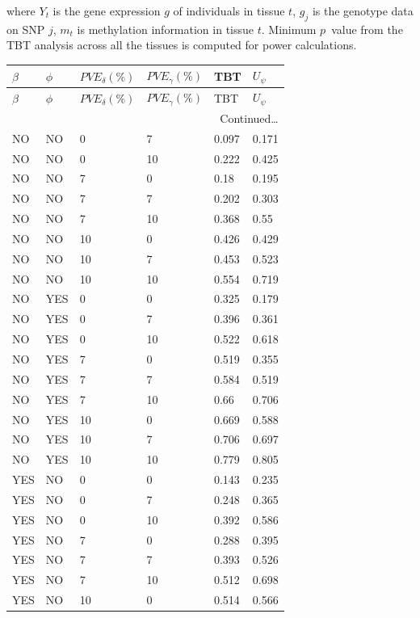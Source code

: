 \documentclass[hidelinks]{article}
\begin{document}
where $Y_t$ is the gene expression $g$ of individuals in tissue $t$, $g_j$ is the genotype data on SNP $j$, $m_t$ is methylation information in tissue $t$. Minimum $p$~value from the TBT analysis across all the tissues is computed for power calculations.

\begin{longtable}{llllll}
\hline
$\beta$ & $\phi$ & $PVE_\delta  (\%)$ & $PVE_\gamma  (\%)$ & TBT & $U_\psi$ \\ \hline
\endfirsthead
$\beta$ & $\phi$ & $PVE_\delta  (\%)$ & $PVE_\gamma  (\%)$ & TBT & $U_\psi$ \\ \hline
\endhead
\multicolumn{6}{r}{{Continued\ldots}} \
\endfoot
\hline
\endlastfoot
NO & NO & 0 & 0 & 0.053 & 0.056 \\
NO & NO & 0 & 7 & 0.097 & 0.171 \\
NO & NO & 0 & 10 & 0.222 & 0.425 \\
NO & NO & 7 & 0 & 0.18 & 0.195 \\
NO & NO & 7 & 7 & 0.202 & 0.303 \\
NO & NO & 7 & 10 & 0.368 & 0.55 \\
NO & NO & 10 & 0 & 0.426 & 0.429 \\
NO & NO & 10 & 7 & 0.453 & 0.523 \\
NO & NO & 10 & 10 & 0.554 & 0.719 \\ \hdashline
NO & YES & 0 & 0 & 0.325 & 0.179 \\
NO & YES & 0 & 7 & 0.396 & 0.361 \\
NO & YES & 0 & 10 & 0.522 & 0.618 \\
NO & YES & 7 & 0 & 0.519 & 0.355 \\
NO & YES & 7 & 7 & 0.584 & 0.519 \\
NO & YES & 7 & 10 & 0.66 & 0.706 \\
NO & YES & 10 & 0 & 0.669 & 0.588 \\
NO & YES & 10 & 7 & 0.706 & 0.697 \\
NO & YES & 10 & 10 & 0.779 & 0.805 \\ \hline
YES & NO & 0 & 0 & 0.143 & 0.235 \\
YES & NO & 0 & 7 & 0.248 & 0.365 \\
YES & NO & 0 & 10 & 0.392 & 0.586 \\
YES & NO & 7 & 0 & 0.288 & 0.395 \\
YES & NO & 7 & 7 & 0.393 & 0.526 \\
YES & NO & 7 & 10 & 0.512 & 0.698 \\
YES & NO & 10 & 0 & 0.514 & 0.566 \\

\end{longtable}
\end{document}

